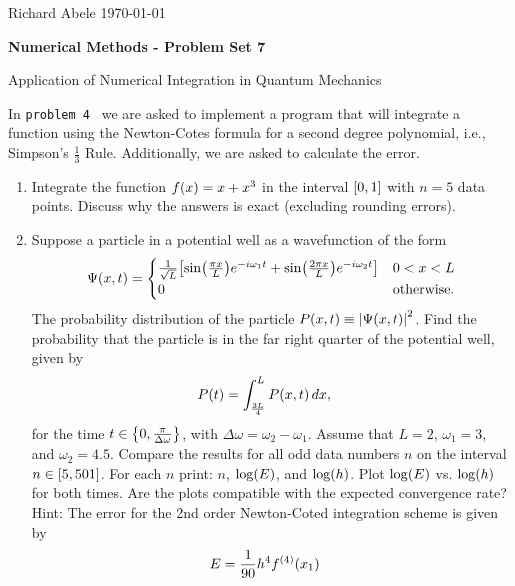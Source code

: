 \documentclass[12pt]{article}
\newenvironment{ex}[2][Exercise]{\begin{trivlist}
\item[\hskip \labelsep {\bfseries #1}\hskip \labelsep {\bfseries #2.}]}{\end{trivlist}}
\DeclarePairedDelimiter\vb{\lvert}{\rvert}
\DeclarePairedDelimiter\rb{(}{)}
\DeclarePairedDelimiter\sqrb{[}{]}
\DeclarePairedDelimiter\cb{\{}{\}}
\begin{document}
\noindent Richard Abele \hfill \today \\[30pt]
\centerline{ \Large{ \textbf{ Numerical Methods - Problem Set 7 }}}

\begin{ex}
    4 Application of Numerical Integration in Quantum Mechanics
\end{ex}

In \texttt{problem 4 } we are asked to implement a program that will integrate a function using the Newton-Cotes formula for a second degree polynomial, i.e., Simpson's \(\frac{1}{3}\) Rule. Additionally, we are asked to calculate the error. 

\begin{enumerate}[label=(\alph*)]
    \item Integrate the function \(f \rb*{x} = x + x^{3}\) in the interval \(\sqrb*{0,1}\) with \(n = 5\) data points. Discuss why the answers is exact (excluding rounding errors).
    \item Suppose a particle in a potential well as a wavefunction of the form 
        \begin{align*}
            \Psi \rb*{x,t} =
            \begin{cases}
                \frac{1}{\sqrt{L}} \sqrb*{ \sin \rb*{\frac{\pi x }{L}} e^{-i \omega_{1} t}  + \sin \rb*{\frac{2 \pi x}{L} } e^{-i \omega_{2} t}   } & 0 < x < L \\
                    0 & \text{otherwise}.
            \end{cases}
        \end{align*}
        The probability distribution of the particle \(P \rb*{x, t} \equiv \vb*{\Psi \rb*{x,t}}^{2}\). Find the probability that the particle is in the far right quarter of the potential well, given by 
        \begin{align*}
            P\rb*{t} & =  
            \int_{\frac{3L}{4}}^{L} {P \rb*{x, t}} \,d x,&\\
        \end{align*}
        for the time \(t \in \cb*{0, \frac{\pi}{\Delta \omega}}\), with \(\Delta \omega = \omega_{2} - \omega_{1}\). Assume that \(L = 2\text{, }  \omega_{1} = 3\), and \(\omega_{2} = 4.5\). 
        Compare the results for all odd data numbers \(n\) on the interval \(n \in \sqrb*{5, 501}\). For each \(n\) print: \(n\), \(\log \rb*{E}\), and \(\log\rb*{h}\). Plot \(\log \rb*{E}\) vs. \(\log \rb*{h}\) for both times. Are the plots compatible with the expected convergence rate?  \\
        Hint: The error for the 2nd order Newton-Coted integration scheme is given by 
        \begin{align*}
            E & =  \frac{1}{90} h^{4} f^{\rb*{4}} \rb*{x_{1}} &\\
        \end{align*}
       
\end{enumerate}
\end{document}
